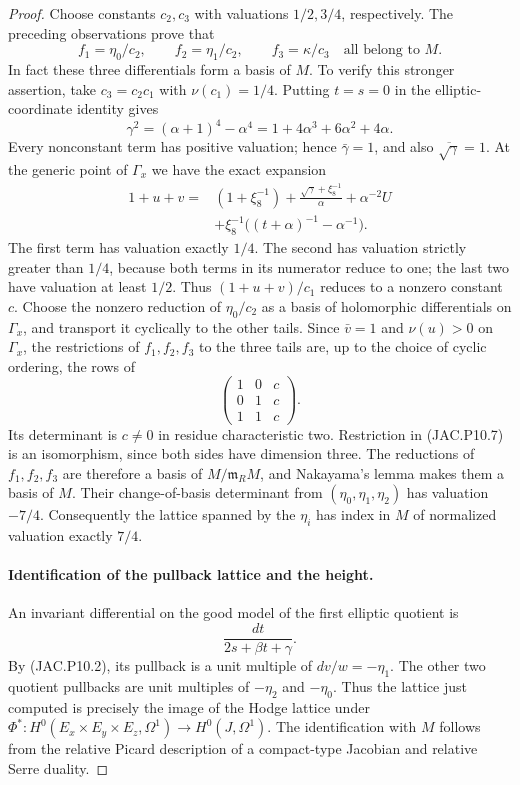 \begin{proof}
Choose constants $c_2,c_3$ with valuations $1/2,3/4$, respectively.
The preceding observations prove that
\[
 f_1=\eta_0/c_2,\qquad f_2=\eta_1/c_2,
 \qquad f_3=\kappa/c_3
 \quad\text{all belong to }M.                            \tag{JAC.P10.8}
\]
In fact these three differentials form a basis of $M$. To verify
this stronger assertion, take $c_3=c_2c_1$ with $\nu(c_1)=1/4$.
Putting $t=s=0$ in the elliptic-coordinate identity gives
\[
 \gamma^2=(\alpha+1)^4-\alpha^4
   =1+4\alpha^3+6\alpha^2+4\alpha.
\]
Every nonconstant term has positive valuation; hence
$\bar\gamma=1$, and also $\overline{\sqrt\gamma}=1$.
At the generic point of $\Gamma_x$ we have the exact expansion
\[
 \begin{split}
 1+u+v={}&(1+\xi_8^{-1})
       +\frac{\sqrt\gamma+\xi_8^{-1}}{\alpha}
       +\alpha^{-2}U\\
 &+\xi_8^{-1}\bigl((t+\alpha)^{-1}-\alpha^{-1}\bigr).
 \end{split}                                             \tag{JAC.P10.8a}
\]
The first term has valuation exactly $1/4$. The second has valuation
strictly greater than $1/4$, because both terms in its numerator
reduce to one; the last two have valuation at least $1/2$.
Thus $(1+u+v)/c_1$ reduces to a nonzero constant $c$.
Choose the nonzero reduction of $\eta_0/c_2$ as a basis of
holomorphic differentials on $\Gamma_x$, and transport it cyclically
to the other tails. Since $\bar v=1$ and $\nu(u)>0$
on $\Gamma_x$, the restrictions of $f_1,f_2,f_3$ to the three tails
are, up to the choice of cyclic ordering, the rows of
\[
 \begin{pmatrix}
 1&0&c\\ 0&1&c\\ 1&1&c
 \end{pmatrix}.
                                                        \tag{JAC.P10.8b}
\]
Its determinant is $c\ne0$ in residue characteristic two.
Restriction in (JAC.P10.7) is an isomorphism, since both sides have
dimension three. The reductions of $f_1,f_2,f_3$ are therefore a
basis of $M/\mathfrak m_R M$, and Nakayama's lemma makes them a
basis of $M$. Their change-of-basis determinant from
$(\eta_0,\eta_1,\eta_2)$ has valuation $-7/4$.
Consequently the lattice spanned by the $\eta_i$ has index in $M$
of normalized valuation exactly $7/4$.

\paragraph{Identification of the pullback lattice and the height.}
An invariant differential on the good model of the first elliptic
quotient is
\[
 \frac{dt}{2s+\beta t+\gamma}.
\]
By (JAC.P10.2), its pullback is a unit multiple of $dv/w=-\eta_1$.
The other two quotient pullbacks are unit multiples of
$-\eta_2$ and $-\eta_0$. Thus the lattice just computed is precisely
the image of the Hodge lattice under
$\Phi^*:H^0(E_x\times E_y\times E_z,\Omega^1)\to H^0(J,\Omega^1)$.
The identification with $M$ follows from the relative Picard
description of a compact-type Jacobian and relative Serre duality.


\end{proof}
